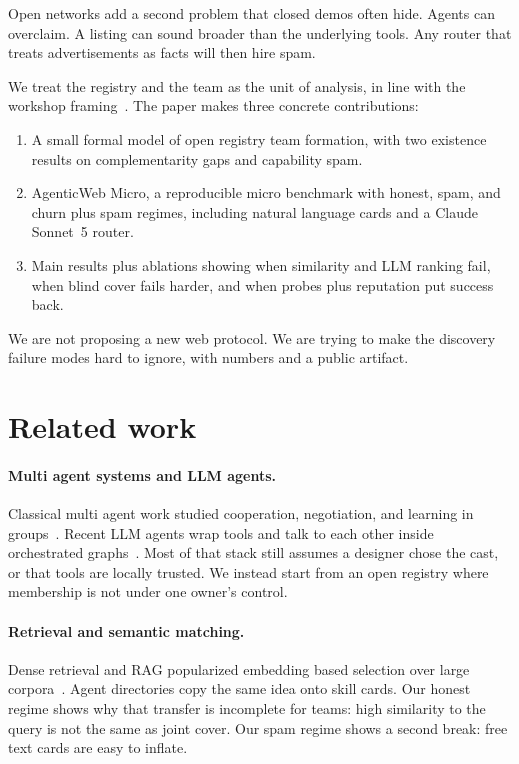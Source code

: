 \documentclass{article}
\begin{document}
Open networks add a second problem that closed demos often hide.
Agents can overclaim.
A listing can sound broader than the underlying tools.
Any router that treats advertisements as facts will then hire spam.

We treat the registry and the team as the unit of analysis, in line with the workshop framing~\citep{projectnanda2026}.
The paper makes three concrete contributions:
\begin{enumerate}
    \item A small formal model of open registry team formation, with two existence results on complementarity gaps and capability spam.
    \item AgenticWeb Micro, a reproducible micro benchmark with honest, spam, and churn plus spam regimes, including natural language cards and a Claude Sonnet~5 router.
    \item Main results plus ablations showing when similarity and LLM ranking fail, when blind cover fails harder, and when probes plus reputation put success back.
\end{enumerate}

We are not proposing a new web protocol.
We are trying to make the discovery failure modes hard to ignore, with numbers and a public artifact.

\section{Related work}

\paragraph{Multi agent systems and LLM agents.}
Classical multi agent work studied cooperation, negotiation, and learning in groups~\citep{wooldridge2009,stone2000}.
Recent LLM agents wrap tools and talk to each other inside orchestrated graphs~\citep{shen2023,wu2023,yao2023,schick2023}.
Most of that stack still assumes a designer chose the cast, or that tools are locally trusted.
We instead start from an open registry where membership is not under one owner's control.

\paragraph{Retrieval and semantic matching.}
Dense retrieval and RAG popularized embedding based selection over large corpora~\citep{karpukhin2020,lewis2020}.
Agent directories copy the same idea onto skill cards.
Our honest regime shows why that transfer is incomplete for teams: high similarity to the query is not the same as joint cover.
Our spam regime shows a second break: free text cards are easy to inflate.
\end{document}
